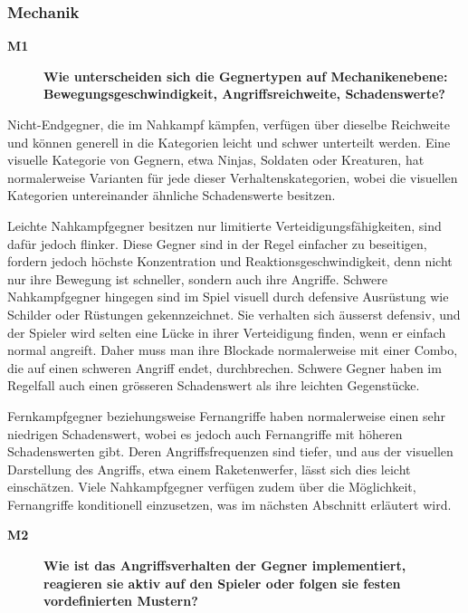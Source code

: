 \documentclass[../Main.tex]{subfiles}
\begin{document}
\subsubsection{Mechanik}

\begin{description}
    \item[\textbf{M1}] \textbf{Wie unterscheiden sich die Gegnertypen auf Mechanikenebene: Bewegungsgeschwindigkeit, Angriffsreichweite, Schadenswerte?}
\end{description}

Nicht-Endgegner, die im Nahkampf kämpfen, verfügen über dieselbe Reichweite und können generell in die Kategorien leicht und schwer unterteilt werden. Eine visuelle Kategorie von Gegnern, etwa Ninjas, Soldaten oder Kreaturen, hat normalerweise Varianten für jede dieser Verhaltenskategorien, wobei die visuellen Kategorien untereinander ähnliche Schadenswerte besitzen.

Leichte Nahkampfgegner besitzen nur limitierte Verteidigungsfähigkeiten, sind dafür jedoch flinker. Diese Gegner sind in der Regel einfacher zu beseitigen, fordern jedoch höchste Konzentration und Reaktionsgeschwindigkeit, denn nicht nur ihre Bewegung ist schneller, sondern auch ihre Angriffe. Schwere Nahkampfgegner hingegen sind im Spiel visuell durch defensive Ausrüstung wie Schilder oder Rüstungen gekennzeichnet. Sie verhalten sich äusserst defensiv, und der Spieler wird selten eine Lücke in ihrer Verteidigung finden, wenn er einfach normal angreift. Daher muss man ihre Blockade normalerweise mit einer Combo, die auf einen schweren Angriff endet, durchbrechen. Schwere Gegner haben im Regelfall auch einen grösseren Schadenswert als ihre leichten Gegenstücke.

Fernkampfgegner beziehungsweise Fernangriffe haben normalerweise einen sehr niedrigen Schadenswert, wobei es jedoch auch Fernangriffe mit höheren Schadenswerten gibt. Deren Angriffsfrequenzen sind tiefer, und aus der visuellen Darstellung des Angriffs, etwa einem Raketenwerfer, lässt sich dies leicht einschätzen. Viele Nahkampfgegner verfügen zudem über die Möglichkeit, Fernangriffe konditionell einzusetzen, was im nächsten Abschnitt erläutert wird.

\begin{description}
    \item[\textbf{M2}] \textbf{Wie ist das Angriffsverhalten der Gegner implementiert, reagieren sie aktiv auf den Spieler oder folgen sie festen vordefinierten Mustern?}
\end{description}
\end{document}
